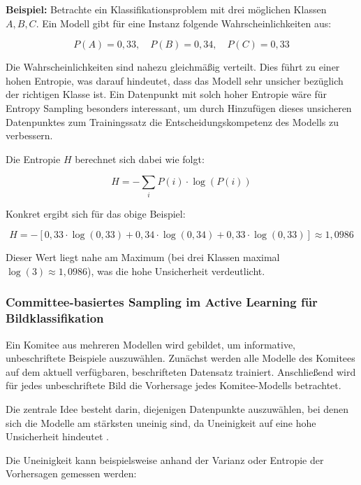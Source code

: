 \documentclass{article}
\begin{document}
	\textbf{Beispiel:}  
	Betrachte ein Klassifikationsproblem mit drei möglichen Klassen $A, B, C$. Ein Modell gibt für eine Instanz folgende Wahrscheinlichkeiten aus:
	
	\begin{equation}
		P(A) = 0{,}33, \quad P(B) = 0{,}34, \quad P(C) = 0{,}33
	\end{equation}
	
	Die Wahrscheinlichkeiten sind nahezu gleichmäßig verteilt. Dies führt zu einer hohen Entropie, was darauf hindeutet, dass das Modell sehr unsicher bezüglich der richtigen Klasse ist. Ein Datenpunkt mit solch hoher Entropie wäre für Entropy Sampling besonders interessant, um durch Hinzufügen dieses unsicheren Datenpunktes zum Trainingssatz die Entscheidungskompetenz des Modells zu verbessern.
	
	Die Entropie $H$ berechnet sich dabei wie folgt:
	
	\begin{equation}
		H = - \sum_{i} P(i) \cdot \log\left(P(i)\right)
	\end{equation}
	
	Konkret ergibt sich für das obige Beispiel:
	
	\begin{equation}
		H = -\left[0{,}33 \cdot \log(0{,}33) + 0{,}34 \cdot \log(0{,}34) + 0{,}33 \cdot \log(0{,}33)\right] \approx 1{,}0986
	\end{equation}
	
	Dieser Wert liegt nahe am Maximum (bei drei Klassen maximal $\log(3) \approx 1{,}0986$), was die hohe Unsicherheit verdeutlicht.
	
	\subsubsection{Committee-basiertes Sampling im Active Learning für Bildklassifikation}
	Ein Komitee aus mehreren Modellen wird gebildet, um informative, unbeschriftete Beispiele auszuwählen. Zunächst werden alle Modelle des Komitees auf dem aktuell verfügbaren, beschrifteten Datensatz trainiert. Anschließend wird für jedes unbeschriftete Bild die Vorhersage jedes Komitee-Modells betrachtet.
	
	Die zentrale Idee besteht darin, diejenigen Datenpunkte auszuwählen, bei denen sich die Modelle am stärksten uneinig sind, da Uneinigkeit auf eine hohe Unsicherheit hindeutet \cite{Freund1997}.
	
	Die Uneinigkeit kann beispielsweise anhand der Varianz oder Entropie der Vorhersagen gemessen werden:
	
\end{document}
